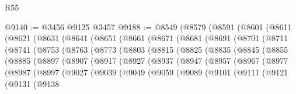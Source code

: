 \begin{lexlean}{R55}
\begin{coremodule}
@9140 := @3456 @9125 @3457
@9188 := @8549
    (@8579
      (@8591
        (@8601
          (@8611
            (@8621
              (@8631
                (@8641
                  (@8651
                    (@8661
                      (@8671
                        (@8681
                          (@8691
                            (@8701
                              (@8711
                                (@8741
                                  (@8753
                                    (@8763
                                      (@8773
                                        (@8803
                                          (@8815
                                            (@8825
                                              (@8835
                                                (@8845
                                                  (@8855
                                                    (@8885
                                                      (@8897
                                                        (@8907
                                                          (@8917
                                                            (@8927
                                                              (@8937
                                                                (@8947
                                                                  (@8957
                                                                    (@8967
                                                                      (@8977
                                                                        (@8987
                                                                          (@8997
                                                                            (@9027
                                                                              (@9039
                                                                                (@9049
                                                                                  (@9059
                                                                                    (@9089
                                                                                      (@9101
                                                                                        (@9111
                                                                                          (@9121
                                                                                            (@9131
                                                                                              (@9138

\end{coremodule}
\end{lexlean}
